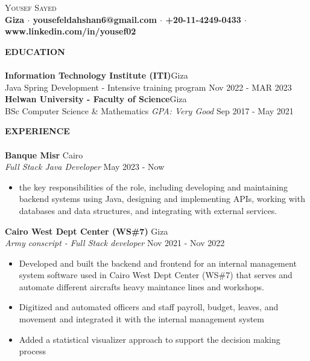 \documentclass[a4paper]{article}
\newcommand{\lineunder} {
    \vspace*{-5pt} \\
    \hspace*{-18pt} \hrulefill \\
}
\newcommand{\header} [1] {
    {\hspace*{-18pt}\vspace*{6pt} \textsc{#1}}
    \vspace*{-6pt} \lineunder
}
\begin{document}
\vspace*{-50pt}

    


\begin{center}
	{\Huge \scshape Yousef Sayed}\\
    \vspace{10pt}
	\textbf{Giza $\cdot$ yousefeldahshan6@gmail.com $\cdot$ +20-11-4249-0433 $\cdot$ www.linkedin.com/in/yousef02}\\
\end{center}
\vspace{20pt}
\header{\textbf{EDUCATION}}
\vspace{5pt}
\textbf{Information Technology Institute (ITI)}\hfill Giza\\
Java Spring Development - Intensive training program \hfill Nov 2022 - MAR 2023\\

\vspace{10pt}
\textbf{Helwan University - Faculty of Science}\hfill Giza\\
BSc Computer Science \& Mathematics \textit{GPA: Very Good} \hfill Sep 2017 - May 2021\\
\vspace{10pt}




\header{\textbf{EXPERIENCE}}

\textbf{Banque Misr} \hfill Cairo\\
\textit{Full Stack Java Developer} \hfill May 2023 - Now\\
\vspace{-1mm}
\begin{itemize} \itemsep 1pt
	\item the key responsibilities of the role, including developing and maintaining backend systems using Java,
designing and implementing APIs, working with databases and data structures, and integrating with
external services.
\end{itemize}
\vspace{5pt}
 \vspace{5pt}

\textbf{Cairo West Dept Center (WS\#7)} \hfill Giza\\
\textit{Army conscript - Full Stack developer} \hfill Nov 2021 - Nov 2022\\
\vspace{-1mm}
\begin{itemize} \itemsep 1pt
	\item Developed and built the backend and frontend for an internal management system software used in Cairo West Dept Center (WS\#7) that serves and automate different aircrafts heavy maintance lines and workshops.
	\item Digitized and automated officers and staff payroll, budget, leaves, and movement and integrated it with the internal management system
	\item Added a statistical visualizer approach to support the decision making process
\end{itemize}
\vspace{5pt}
 
\end{document}
